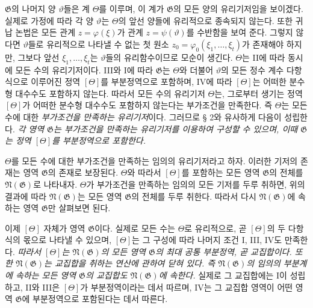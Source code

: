 $\mathfrak G$의 나머지 양 $\vartheta$들은 계 $\Theta$를 이루며, 이 계가 $\mathfrak G$의 모든 양의 유리기저임을 보이겠다. 실제로 가정에 따라 각 양 $\vartheta$는 $\Theta$의 앞선 양들에 유리적으로 종속되지 않는다. 또한 귀납 논법은 모든 관계 $z=\varphi(\xi)$가 관계 $z=\psi(\vartheta)$를 수반함을 보여 준다. 그렇지 않다면 $\vartheta$들로 유리적으로 나타낼 수 없는 첫 원소 $z_0=\varphi_0(\xi_1,\ldots,\xi_t)$가 존재해야 하지만, 그보다 앞선 $\xi_1,\ldots,\xi_t$는 $\vartheta$들의 유리함수이므로 모순이 생긴다. $\Theta$는 II에 따라 동시에 모든 수의 유리기저이다. III와 I에 따라 $\mathfrak G$는 $\Theta$와 더불어 $\vartheta$의 모든 정수 계수 다항식으로 이루어진 정역 $[\Theta]$를 부분정역으로 포함하며, IV에 따라 $[\Theta]$는 어떠한 분수형 대수수도 포함하지 않는다. 따라서 모든 수의 유리기저 $\Theta$는, 그로부터 생기는 정역 $[\Theta]$가 어떠한 분수형 대수수도 포함하지 않는다는 부가조건을 만족한다. 즉 $\Theta$는 모든 수에 대한 \emph{부가조건을 만족하는 유리기저}이다. 그러므로 § 2와 유사하게 다음이 성립한다. \emph{각 영역 $\mathfrak G$는 부가조건을 만족하는 유리기저를 이용하여 구성할 수 있으며, 이때 $\mathfrak G$는 정역 $[\Theta]$를 부분정역으로 포함한다.}

$\Theta$를 모든 수에 대한 부가조건을 만족하는 임의의 유리기저라고 하자. 이러한 기저의 존재는 영역 $\mathfrak G$의 존재로 보장된다. $\Theta$와 따라서 $[\Theta]$를 포함하는 모든 영역 $\mathfrak G$의 전체를 $\mathfrak N(\mathfrak G)$로 나타내자. $\Theta$가 부가조건을 만족하는 임의의 모든 기저를 두루 취하면, 위의 결과에 따라 $\mathfrak N(\mathfrak G)$는 모든 영역 $\mathfrak G$의 전체를 두루 취한다. 따라서 다시 $\mathfrak N(\mathfrak G)$에 속하는 영역 $\mathfrak G$만 살펴보면 된다.

이제 $[\Theta]$ 자체가 영역 $\mathfrak G$이다. 실제로 모든 수는 $\Theta$로 유리적으로, 곧 $[\Theta]$의 두 다항식의 몫으로 나타낼 수 있으며, $[\Theta]$는 그 구성에 따라 나머지 조건 I, III, IV도 만족한다. \emph{따라서 $[\Theta]$는 $\mathfrak N(\mathfrak G)$의 모든 영역 $\mathfrak G$의 최대 공통 부분정역, 곧 교집합이다. 또한 $\mathfrak N(\mathfrak G)$는 교집합을 취하는 연산에 관하여 닫혀 있다. 즉 $\mathfrak N(\mathfrak G)$의 임의의 부분계에 속하는 모든 영역 $\mathfrak G$의 교집합도 $\mathfrak N(\mathfrak G)$에 속한다.} 실제로 그 교집합에는 I이 성립하고, II와 III은 $[\Theta]$가 부분정역이라는 데서 따르며, IV는 그 교집합 영역이 어떤 영역 $\mathfrak G$에 부분정역으로 포함된다는 데서 따른다.

